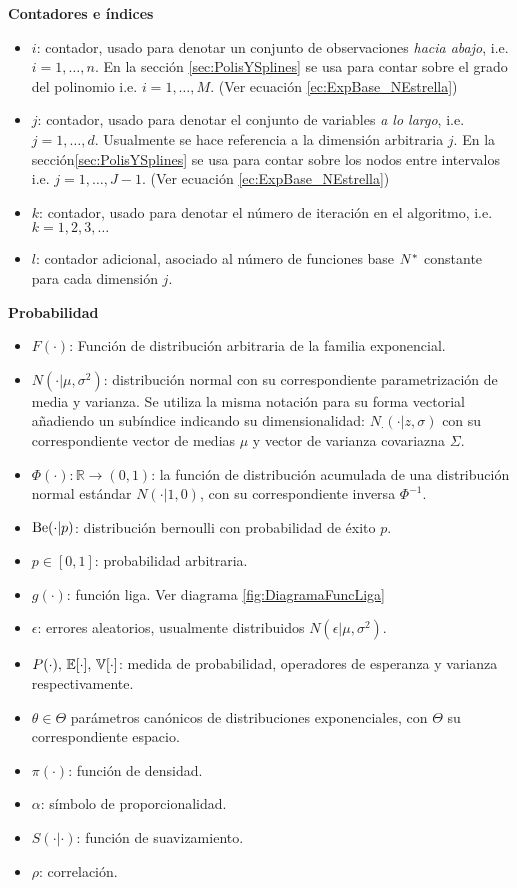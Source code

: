 \documentclass[../../Main/Main.tex]{subfiles}
\begin{document}
\textbf{Contadores e índices}
\begin{itemize}[label={}]
	\item $i$: contador, usado para denotar un conjunto de observaciones \textit{hacia abajo}, i.e. $i = 1,\ldots,n$. En la sección \ref{sec:PolisYSplines} se usa para contar sobre el grado del polinomio i.e. $i = 1,\ldots,M$. (Ver ecuación \ref{ec:ExpBase_NEstrella})
	\item $j$: contador, usado para denotar el conjunto de variables \textit{a lo largo}, i.e. $j = 1,\ldots,d$. Usualmente se hace referencia a la dimensión arbitraria $j$. En la sección\ref{sec:PolisYSplines} se usa para contar sobre los nodos entre intervalos i.e. $j = 1,\ldots,J-1$. (Ver ecuación \ref{ec:ExpBase_NEstrella})
	\item $k$: contador, usado para denotar el número de iteración en el algoritmo, i.e. $k = 1,2,3,\ldots$
	\item $l$: contador adicional, asociado al número de funciones base $N^*$ constante para cada dimensión $j$.
\end{itemize}
	
\textbf{Probabilidad}
\begin{itemize}[label={}]
	\item $F(\cdot)$: Función de distribución arbitraria de la familia exponencial. 
	\item $N(\cdot|\mu,\sigma^2)$: distribución normal con su correspondiente parametrización de media y varianza. Se utiliza la misma notación para su forma vectorial añadiendo un subíndice indicando su dimensionalidad: $N_{\cdot}(\cdot|z,\sigma)$ con su correspondiente vector de medias $\mu$ y vector de varianza covariazna $\Sigma$. 
	\item $\Phi(\cdot):\mathbb{R}\rightarrow(0,1)$: la función de distribución acumulada de una distribución normal estándar $N(\cdot| 1,0)$, con su correspondiente inversa $\Phi^{-1}$. 
	\item $\text{Be}(\cdot|p)$: distribución bernoulli con probabilidad de éxito $p$.
	\item $p \in [0,1]$: probabilidad arbitraria. 
	\item $g(\cdot)$: función liga. Ver diagrama \ref{fig:DiagramaFuncLiga}
	\item $\epsilon$: errores aleatorios, usualmente distribuidos $N(\epsilon|\mu,\sigma^2)$.
	\item $P(\cdot),\, \mathbb{E}[\cdot],\, \mathbb{V}[\cdot]$: medida de probabilidad, operadores de esperanza y varianza respectivamente.
	\item $\theta \in \Theta$ parámetros canónicos de distribuciones exponenciales, con $\Theta$ su correspondiente espacio. 
	\item $\pi(\cdot)$: función de densidad.
	\item $\alpha$: símbolo de proporcionalidad.
	\item $S(\cdot|\cdot)$: función de suavizamiento. 
	\item $\rho$: correlación.
\end{itemize}
	
\end{document}
